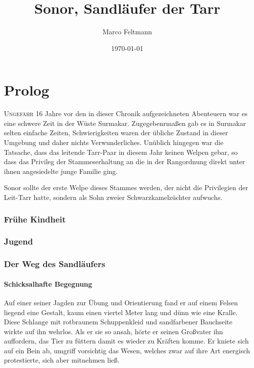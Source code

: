 \documentclass[a4paper]{scrreprt}
\author{Marco Feltmann}
\title{ {Sonor}, Sandläufer der Tarr }
\date{\today}
\def\capitalsfont{\usefont{U}{AnnSton}{xl}{n}\selectfont}
\newcommand{\capital}[2]{\lettrine[lines=8]{\capitalsfont #1}{#2}}
\begin{document}
	\maketitle
	
	\tableofcontents

	\part{Prolog}
	
	\capital{U}{ngefähr} 16 Jahre vor den in dieser Chronik aufgezeichneten Abenteuern war es eine schwere Zeit in der Wüste Surmakar. Zugegebenrmaßen gab es in Surmakar selten einfache Zeiten, Schwierigkeiten waren der übliche Zustand in dieser Umgebung und daher nichts Verwunderliches. 
	Unüblich hingegen war die Tatsache, dass das leitende Tarr-Paar in diesem Jahr keinen Welpen gebar, so dass das Privileg der Stammeserhaltung an die in der Rangordnung direkt unter ihnen angesiedelte junge Familie ging.
	
	Sonor sollte der erste Welpe dieses Stammes werden, der nicht die Privilegien der Leit-Tarr hatte, sondern als Sohn zweier Schwarzkamelzüchter aufwuchs.

	
	\section{Frühe Kindheit}
	
	\section{Jugend}
	
	\section{Der Weg des Sandläufers}
	\subsection{Schicksalhafte Begegnung}
	Auf einer seiner Jagden zur Übung und Orientierung fand er auf einem Felsen liegend eine Gestalt, kaum einen viertel Meter lang und dünn wie eine Kralle. Diese Schlange mit rotbraunem Schuppenkleid und sandfarbener Bauchseite wirkte auf ihn wehrlos.
	Als er sie so ansah, hörte er seinen Großvater ihn auffordern, das Tier zu füttern damit es wieder zu Kräften komme.
	Er kniete sich auf ein Bein ab, umgriff vorsichtig das Wesen, welches zwar auf ihre Art energisch protestierte, sich aber mitnehmen ließ.
	
\end{document}
